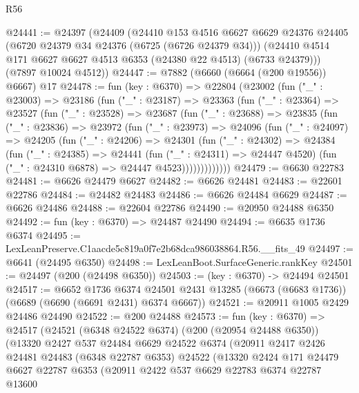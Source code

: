 \begin{lexlean}{R56}
\begin{coremodule}
@24441 := @24397
    (@24409
      (@24410
        @153
        @4516
        @6627
        @6629
        @24376
        @24405
        (@6720 @24379 @34 @24376 (@6725 (@6726 @24379 @34)))
        (@24410 @4514 @171 @6627 @6627 @4513 @6353 (@24380 @22 @4513) (@6733 @24379)))
      (@7897 @10024 @4512))
@24447 := @7882 (@6660 (@6664 (@200 @19556)) @6667) @17
@24478 := fun (key : @6370) =>
  @22804
    (@23002
      (fun ("_" : @23003) =>
      @23186
        (fun ("_" : @23187) =>
        @23363
          (fun ("_" : @23364) =>
          @23527
            (fun ("_" : @23528) =>
            @23687
              (fun ("_" : @23688) =>
              @23835
                (fun ("_" : @23836) =>
                @23972
                  (fun ("_" : @23973) =>
                  @24096
                    (fun ("_" : @24097) =>
                    @24205
                      (fun ("_" : @24206) =>
                      @24301
                        (fun ("_" : @24302) =>
                        @24384
                          (fun ("_" : @24385) =>
                          @24441
                            (fun ("_" : @24311) => @24447 @4520)
                            (fun ("_" : @24310 @6878) => @24447 @4523)))))))))))))
@24479 := @6630 @22783
@24481 := @6626 @24479 @6627
@24482 := @6626 @24481
@24483 := @22601 @22786
@24484 := @24482 @24483
@24486 := @6626 @24484 @6629
@24487 := @6626 @24486
@24488 := @22604 @22786
@24490 := @20950 @24488 @6350
@24492 := fun (key : @6370) => @24487 @24490
@24494 := @6635 @1736 @6374
@24495 := LexLeanPreserve.C1aacde5c819a0f7e2b68dca986038864.R56.__fits_49
@24497 := @6641 (@24495 @6350)
@24498 := LexLeanBoot.SurfaceGeneric.rankKey
@24501 := @24497 (@200 (@24498 @6350))
@24503 := (key : @6370) -> @24494 @24501
@24517 := @6652
    @1736
    @6374
    @24501
    @2431
    @13285
    (@6673 (@6683 @1736))
    (@6689 (@6690 (@6691 @2431) @6374 @6667))
@24521 := @20911 @1005 @2429 @24486 @24490
@24522 := @200 @24488
@24573 := fun (key : @6370) =>
  @24517
    (@24521
      (@6348 @24522 @6374)
      (@200 (@20954 @24488 @6350))
      (@13320
        @2427
        @537
        @24484
        @6629
        @24522
        @6374
        (@20911
          @2417
          @2426
          @24481
          @24483
          (@6348 @22787 @6353)
          @24522
          (@13320
            @2424
            @171
            @24479
            @6627
            @22787
            @6353
            (@20911
              @2422
              @537
              @6629
              @22783
              @6374
              @22787
              @13600

\end{coremodule}
\end{lexlean}
